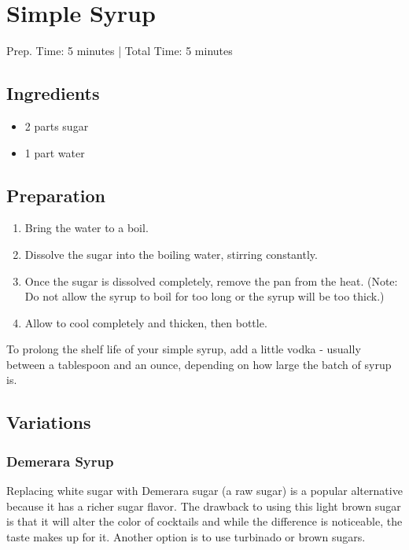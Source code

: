 \section{Simple Syrup}

Prep. Time: 5 minutes |
Total Time: 5 minutes

\subsection{Ingredients}
\begin{itemize}
    \item 2 parts sugar
    \item 1 part water
\end{itemize}

\subsection{Preparation}
\begin{enumerate}
    \item Bring the water to a boil.
    \item Dissolve the sugar into the boiling water, stirring constantly.
    \item Once the sugar is dissolved completely, remove the pan from the heat. (Note: Do not allow the syrup to boil for too long or the syrup will be too thick.)
    \item Allow to cool completely and thicken, then bottle.
\end{enumerate}

To prolong the shelf life of your simple syrup, add a little vodka - usually between a tablespoon and an ounce, depending on how large the batch of syrup is.

\subsection{Variations}

\subsubsection{Demerara Syrup}
Replacing white sugar with Demerara sugar (a raw sugar) is a popular alternative because it has a richer sugar flavor. The drawback to using this light brown sugar is that it will alter the color of cocktails and while the difference is noticeable, the taste makes up for it. Another option is to use turbinado or brown sugars.

